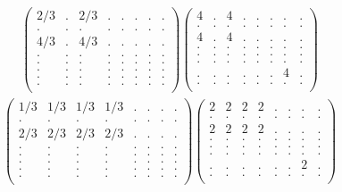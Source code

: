 \documentclass[12pt,a4paper]{amsart}
\begin{document}
\begin{align*}
\left(\begin{array}{rrrrrrrr}%
2/3&.&2/3&.&.&.&.&.\\%
.&.&.&.&.&.&.&.\\%
4/3&.&4/3&.&.&.&.&.\\%
.&.&.&.&.&.&.&.\\%
.&.&.&.&.&.&.&.\\%
.&.&.&.&.&.&.&.\\%
.&.&.&.&.&.&.&.\\%
.&.&.&.&.&.&.&.\\%
\end{array}\right)%
\left(\begin{array}{rrrrrrrr}%
4&.&4&.&.&.&.&.\\%
.&.&.&.&.&.&.&.\\%
4&.&4&.&.&.&.&.\\%
.&.&.&.&.&.&.&.\\%
.&.&.&.&.&.&.&.\\%
.&.&.&.&.&.&.&.\\%
.&.&.&.&.&.&4&.\\%
.&.&.&.&.&.&.&.\\%
\end{array}\right)%
\end{align*}
\begin{align*}
\left(\begin{array}{rrrrrrrr}%
1/3&1/3&1/3&1/3&.&.&.&.\\%
.&.&.&.&.&.&.&.\\%
2/3&2/3&2/3&2/3&.&.&.&.\\%
.&.&.&.&.&.&.&.\\%
.&.&.&.&.&.&.&.\\%
.&.&.&.&.&.&.&.\\%
.&.&.&.&.&.&.&.\\%
.&.&.&.&.&.&.&.\\%
\end{array}\right)%
\left(\begin{array}{rrrrrrrr}%
2&2&2&2&.&.&.&.\\%
.&.&.&.&.&.&.&.\\%
2&2&2&2&.&.&.&.\\%
.&.&.&.&.&.&.&.\\%
.&.&.&.&.&.&.&.\\%
.&.&.&.&.&.&.&.\\%
.&.&.&.&.&.&2&.\\%
.&.&.&.&.&.&.&.\\%
\end{array}\right)%
\end{align*}
\end{document}
